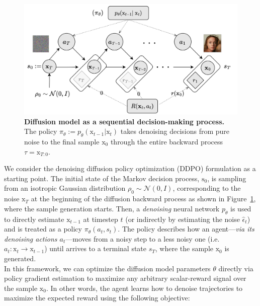\begin{figure}[ht]
  \centering
  \includegraphics[scale=0.85]{img/results/diffusion-model-MDP.png}
  \vspace{-4pt}  %
    \captionsetup{width=\textwidth} %
    \caption{\textbf{Diffusion model as a sequential decision-making process.} The policy $\pi_{\theta}:=p_{\theta}(\mathrm{x}_{t-1} | \mathrm{x}_{t})$  takes denoising decisions from pure noise to the final sample $\mathrm{x}_0$ through the entire backward process $\tau=\mathrm{x}_{T:0}$.}
  \label{fig:diffusion-model-mdp}
\end{figure}

We consider the denoising diffusion policy optimization (DDPO) formulation \citep{black2023training} as a starting point. The initial state of the Markov decision process,
$\mathrm{s}_{0}$, is sampling from an isotropic
Gaussian distribution 
$\rho_{0}\sim\mathcal{N}(0, I)$, corresponding to the
noise $\mathrm{x}_{T}$ at the beginning of the
diffusion backward process as shown in Figure~\ref{fig:diffusion-model-mdp}, where the sample
generation starts. 
Then, a \textit{denoising} neural network $p_{\theta}$
is used to directly estimate $\mathrm{x}_{t-1}$ at
timestep $t$ (or indirectly by
estimating the noise $\hat{\epsilon}_{t}$) and is
treated as a policy $\pi_{\theta}(a_{t}, s_{t})$. The policy describes how an agent---\textit{via its denoising actions $a_{t}$}---moves from a noisy
step to a less noisy one (i.e. 
$a_t: \mathrm{x}_{t} \rightarrow \mathrm{x}_{t-1}$) until arrives to a terminal state $s_T$, where the sample $\mathrm{x}_{0}$ is generated. \\

\noindent In this framework, we can optimize the diffusion
model parameters $\theta$ directly via policy
gradient estimation to maximize any arbitrary
scalar-reward signal over the sample $\mathrm{x}_{0}$.
In other words, the agent learns how to denoise trajectories to maximize the expected reward using the following objective:

